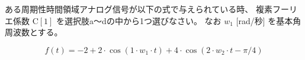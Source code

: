 ある周期性時間領域アナログ信号が以下の式で与えられている時、
複素フーリエ係数 $\textrm{C}[1]$ を選択肢a〜dの中から1つ選びなさい。
なお $w_1$ [rad/秒] を基本角周波数とする。

\[
f(t) = 
-2
+ 2 \cdot \cos( 1 \cdot w_1 \cdot t )
+ 4 \cdot \cos( 2 \cdot w_2 \cdot t - \pi/4)
\]

